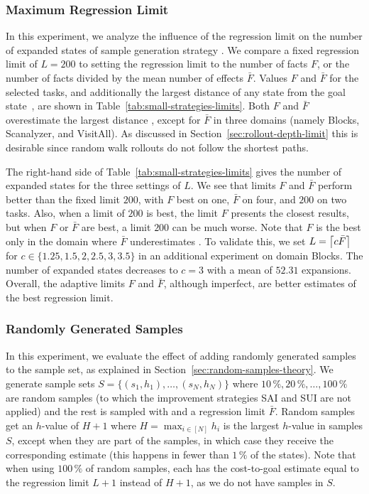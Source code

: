 

\subsubsection{Maximum Regression Limit}

In this experiment, we analyze the influence of the regression limit on the number of expanded states of sample generation strategy \bfsrw. We compare a fixed regression limit of $L=200$ to setting the regression limit to the number of facts $F$, or the number of facts divided by the mean number of effects $\bar F$. Values $F$ and $\bar F$ for the selected tasks, and additionally the largest distance of any state from the goal state~\distfarthest, are shown in Table~\ref{tab:small-strategies-limits}. Both $F$ and $\bar F$ overestimate the largest distance \distfarthest, except for $\bar F$ in three domains (namely Blocks, Scanalyzer, and VisitAll). As discussed in Section~\ref{sec:rollout-depth-limit} this is desirable since random walk rollouts do not follow the shortest paths.



The right-hand side of Table~\ref{tab:small-strategies-limits} gives the number of expanded states for the three settings of $L$. We see that limits $F$ and $\bar F$ perform better than the fixed limit $200$, with $F$ best on one, $\bar F$ on four, and $200$ on two tasks. Also, when a limit of $200$ is best, the limit $F$ presents the closest results, but when $F$ or $\bar F$ are best, a limit $200$ can be much worse. Note that $F$ is the best only in the domain where $\bar F$ underestimates \distfarthest. To validate this, we set $L=\left\lceil c\bar F\right\rceil$ for $c\in\{1.25,1.5,2,2.5,3,3.5\}$ in an additional experiment on domain Blocks. The number of expanded states decreases to $c=3$ with a mean of $52.31$ expansions. Overall, the adaptive limits $F$ and $\bar F$, although imperfect, are better estimates of the best regression limit.

\subsubsection{Randomly Generated Samples}

In this experiment, we evaluate the effect of adding randomly generated samples to the sample set, as explained in Section~\ref{sec:random-samples-theory}. We generate sample sets $S=\{(s_1,h_1),\ldots,(s_N,h_N)\}$ where $10\,\%, 20\,\%,\ldots,100\,\%$ are random samples (to which the improvement strategies SAI and SUI are not applied) and the rest is sampled with \bfsrw and a regression limit $\bar F$. Random samples get an $h$-value of $H+1$ where $H=\max_{i\in[N]} h_i$ is the largest $h$-value in samples $S$, except when they are part of the samples, in which case they receive the corresponding estimate (this happens in fewer than $1\,\%$ of the states). Note that when using $100\,\%$ of random samples, each has the cost-to-goal estimate equal to the regression limit $L+1$ instead of $H+1$, as we do not have samples in $S$.

